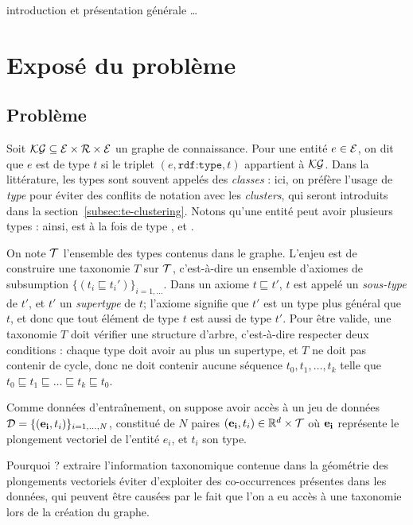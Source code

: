 \label{chap:te}

introduction et présentation générale \ldots


\section{Exposé du problème}
\subsection{Problème}
\label{sec:te-problem}
Soit $\KG \subseteq \Ent \times \Rel \times \Ent$ un graphe de connaissance. Pour une entité $e \in \Ent$, on dit que $e$ est de type $t$ si le triplet $(e, \texttt{rdf:type}, t)$ appartient à $\KG$. Dans la littérature, les types sont souvent appelés des \textit{classes} : ici, on préfère l'usage de \textit{type} pour éviter des conflits de notation avec les \textit{clusters}, qui seront introduits dans la section~\ref{subsec:te-clustering}. Notons qu'une entité peut avoir plusieurs types : ainsi,  est à la fois de type ,  et .

On note $\cal{T}$ l'ensemble des types contenus dans le graphe. L'enjeu est de construire une taxonomie $T$ sur $\cal{T}$, c'est-à-dire un ensemble d'axiomes de subsumption $\{(t_i \sqsubseteq t_i')\}_{i=1, \ldots}$. Dans un axiome $t \sqsubseteq t'$, $t$ est appelé un \textit{sous-type} de $t'$, et $t'$ un \textit{supertype} de $t$; l'axiome signifie que $t'$ est un type plus général que $t$, et donc que tout élément de type $t$ est aussi de type $t'$. Pour être valide, une taxonomie $T$ doit vérifier une structure d'arbre, c'est-à-dire respecter deux conditions : chaque type doit avoir au plus un supertype, et $T$ ne doit pas contenir de cycle, donc ne doit contenir aucune séquence $t_0, t_1, \ldots, t_k$ telle que $t_0 \sqsubseteq t_1 \sqsubseteq \ldots \sqsubseteq t_k \sqsubseteq t_0$.

Comme données d'entraînement, on suppose avoir accès à un jeu de données $\cal{D} = \{ (\mathbf{e_i}, t_i) \}_{i=1, \ldots, N}$, constitué de $N$ paires $(\bf{e_i}, t_i) \in \R^d \times \cal{T}$ où $\bf{e_i}$ représente le plongement vectoriel de l'entité $e_i$, et $t_i$ son type. 

Pourquoi ?
extraire l'information taxonomique contenue dans la géométrie des plongements vectoriels
éviter d'exploiter des co-occurrences présentes dans les données, qui peuvent être causées par le fait que l'on a eu accès à une taxonomie lors de la création du graphe.

